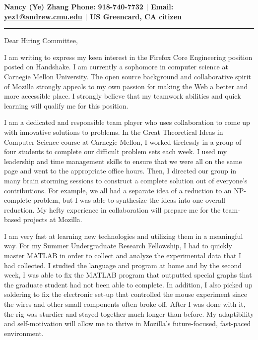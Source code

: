 \documentclass[11pt,letterpaper]{article}
\begin{document}
\begin{center}
\huge\bfseries{Nancy (Ye) Zhang}
\large {Phone: 918-740-7732 | Email: \href{mailto:yez1@andrew.cmu.edu}{yez1@andrew.cmu.edu}
| US Greencard, CA citizen}
\end{center}

\noindent\rule{\textwidth}{1pt}

\large

\vspace*{2em}

\noindent Dear Hiring Committee,

\vspace*{1em}

I am writing to express my keen interest in the Firefox Core Engineering position posted on Handshake. I am currently a sophomore in computer science at Carnegie Mellon University. The open source background and collaborative spirit of Mozilla strongly appeals to my own passion for making the Web a better and more accessible place. I strongly believe that my teamwork abilities and quick learning will qualify me for this position.

\vspace*{0.5em}

I am a dedicated and responsible team player who uses collaboration to come up with innovative solutions to problems. In the Great Theoretical Ideas in Computer Science course at Carnegie Mellon, I worked tirelessly in a group of four students to complete our difficult problem sets each week. I used my leadership and time management skills to ensure that we were all on the same page and went to the appropriate office hours. Then, I directed our group in many brain storming sessions to construct a complete solution out of everyone's contributions. For example, we all had a separate idea of a reduction to an NP-complete problem, but I was able to synthesize the ideas into one overall reduction. My hefty experience in collaboration will prepare me for the team-based projects at Mozilla. 

\vspace*{0.5em}
I am very fast at learning new technologies and utilizing them in a meaningful way. For my Summer Undergraduate Research Fellowship, I had to quickly master MATLAB in order to collect and analyze the experimental data that I had collected. I studied the language and program at home and by the second week, I was able to fix the MATLAB program that outputted special graphs that the graduate student had not been able to complete. In addition, I also picked up soldering to fix the electronic set-up that controlled the mouse experiment since the wires and other small components often broke off. After I was done with it, the rig was sturdier and stayed together much longer than before. My adaptibility and self-motivation will allow me to thrive in Mozilla's future-focused, fast-paced environment. 
\vspace*{0.5em}
\end{document}
